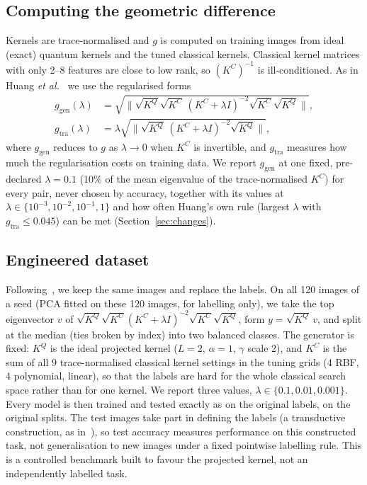 \documentclass[conference]{IEEEtran}
\begin{document}
\subsection{Computing the geometric difference}
Kernels are trace-normalised and $g$ is computed on training images from ideal (exact) quantum kernels and the tuned classical kernels. Classical kernel matrices with only 2--8 features are close to low rank, so $(K^C)^{-1}$ is ill-conditioned. As in Huang \textit{et al.}~\cite[Supplementary Eqs.~F19--F20]{huang2021} we use the regularised forms
\begin{align}
g_{\mathrm{gen}}(\lambda) &= \sqrt{\big\|\sqrt{K^{Q}}\sqrt{K^{C}}\,(K^{C}+\lambda I)^{-2}\sqrt{K^{C}}\sqrt{K^{Q}}\big\|},\\
g_{\mathrm{tra}}(\lambda) &= \lambda\sqrt{\big\|\sqrt{K^{Q}}\,(K^{C}+\lambda I)^{-2}\sqrt{K^{Q}}\big\|},
\end{align}
where $g_{\mathrm{gen}}$ reduces to $g$ as $\lambda\to0$ when $K^C$ is invertible, and $g_{\mathrm{tra}}$ measures how much the regularisation costs on training data. We report $g_{\mathrm{gen}}$ at one fixed, pre-declared $\lambda=0.1$ (10\% of the mean eigenvalue of the trace-normalised $K^C$) for every pair, never chosen by accuracy, together with its values at $\lambda\in\{10^{-3},10^{-2},10^{-1},1\}$ and how often Huang's own rule (largest $\lambda$ with $g_{\mathrm{tra}}\le0.045$) can be met (Section~\ref{sec:changes}).

\subsection{Engineered dataset}\label{sec:eng}
Following~\cite{huang2021}, we keep the same images and replace the labels. On all 120 images of a seed (PCA fitted on these 120 images, for labelling only), we take the top eigenvector $v$ of $\sqrt{K^Q}\sqrt{K^C}(K^C+\lambda I)^{-2}\sqrt{K^C}\sqrt{K^Q}$, form $y=\sqrt{K^Q}\,v$, and split at the median (ties broken by index) into two balanced classes. The generator is fixed: $K^Q$ is the ideal projected kernel ($L=2$, $\alpha=1$, $\gamma$ scale 2), and $K^C$ is the sum of all 9 trace-normalised classical kernel settings in the tuning grids (4 RBF, 4 polynomial, linear), so that the labels are hard for the whole classical search space rather than for one kernel. We report three values, $\lambda\in\{0.1,0.01,0.001\}$. Every model is then trained and tested exactly as on the original labels, on the original splits. The test images take part in defining the labels (a transductive construction, as in~\cite{huang2021}), so test accuracy measures performance on this constructed task, not generalisation to new images under a fixed pointwise labelling rule. This is a controlled benchmark built to favour the projected kernel, not an independently labelled task.
\end{document}
